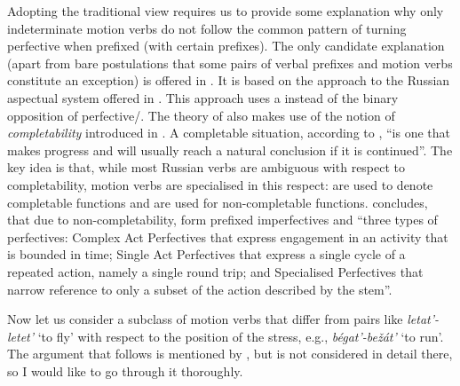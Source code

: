 Adopting the traditional view requires us to provide some explanation why only indeterminate motion verbs do not follow the common pattern of turning perfective when prefixed (with certain prefixes). The only candidate explanation (apart from bare postulations that some pairs of verbal prefixes and motion verbs constitute an exception) is offered in \citealt{Janda:10}. It is based on the approach to the Russian aspectual system offered in \citealt{Janda:07a}. This approach uses a  instead of the binary opposition of perfective/. The theory of \citet{Janda:10} also makes use of the notion of \textit{completability} introduced in \citealt{Janda:07a}. A completable situation, according to \citet[129]{Janda:10}, ``is one that makes progress and will usually reach a natural conclusion if it is continued''. The key idea is that, while most Russian verbs are ambiguous with respect to completability, motion verbs are specialised in this respect:  are used to denote completable functions and  are used for non-completable functions. \citet[138]{Janda:10} concludes, that due to non-completability,  form prefixed imperfectives and ``three types of perfectives: Complex Act Perfectives that express engagement in an activity that is bounded in time; Single Act Perfectives that express a single cycle of a repeated action, namely a single round trip; and Specialised Perfectives that narrow reference to only a subset of the action described by the stem''.

Now let us consider a subclass of motion verbs that differ from pairs like \textit{letat'\textsubscript{\INDET}-letet'\textsubscript{\DET}} `to fly' with respect to the position of the stress, e.g., \textit{b\'{e}gat'\textsubscript{\INDET}-be\v{z}\'{a}t'\textsubscript{\DET}} `to run'. The argument that follows is mentioned by \citet{Isachenko:60}, but is not considered in detail there, so I would like to go through it thoroughly. 

